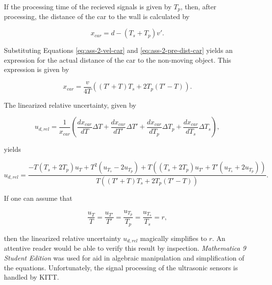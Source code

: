 \documentclass[11pt,titlepage]{report}
\begin{document}
If the processing time of the recieved signals is given by $T_p$, then, after processing, the distance of the car to the wall is calculated by

\begin{equation}
	x_{car} = d-(T_s +T_p) v'.
\end{equation}

Substituting Equations \ref{eq:ass-2-vel-car} and \ref{eq:ass-2-pre-dist-car} yields an expression for the actual distance of the car to the non-moving object. This expression is given by

\begin{equation}
	x_{car} = \frac{v}{4 T} \left((T'+T) T_s + 2 T_p (T'-T)  \right).
\end{equation}

The linearized relative uncertainty, given by

\begin{equation}
	u_{d,rel} = \frac{1}{x_{car}} \left( \frac{d x_{car}}{d T} \Delta T + \frac{d x_{car}}{d T'} \Delta T' + \frac{d x_{car}}{d T_p} \Delta T_p + \frac{d x_{car}}{d T_s} \Delta T_s \right),
\end{equation}

yields

\begin{equation}
	u_{d,rel} = \frac{
		-T(T_s + 2 T_p) u_T + T^2 (u_{T_s} - 2 u_{T_p}) + T \left( (T_s + 2 T_p) u_{T'} + T' (u_{T_s} + 2 u_{T_p}) \right)
	}{
		T \left( (T'+T)T_s + 2 T_p (T'-T) \right)
	}.
\end{equation}

If one can assume that

\begin{equation}
	\frac{u_T}{T} = \frac{u_{T'}}{T'} = \frac{u_{T_p}}{T_p} = \frac{u_{T_s}}{T_s}=r,
\end{equation}

then the linearized relative uncertainty $u_{d,rel}$ magically simplifies to $r$. An attentive reader would be able to verify this result by inspection. \textit{Mathematica 9 Student Edition} was used for aid in algebraic manipulation and simplification of the equations. Unfortunately, the signal processing of the ultrasonic sensors is handled by KITT.
\end{document}
